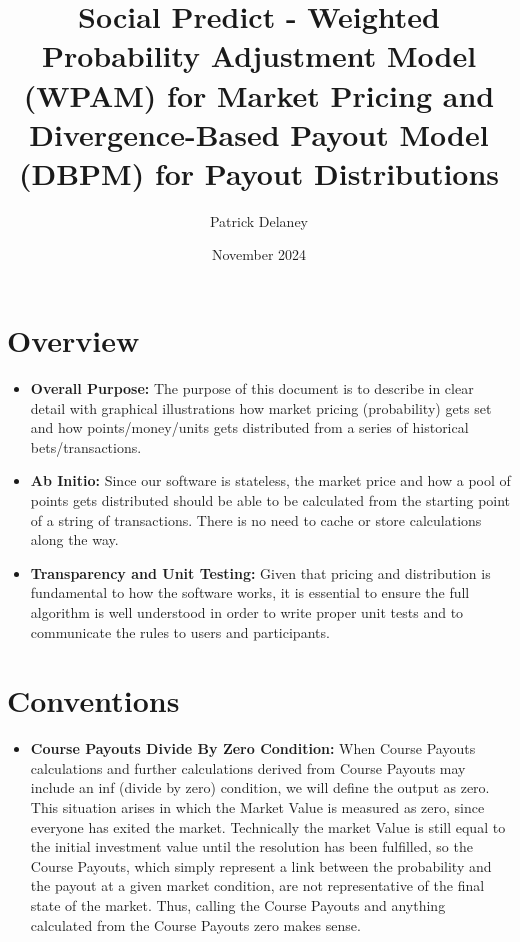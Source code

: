 \documentclass{article}
\title{Social Predict - Weighted Probability Adjustment Model (WPAM) for Market Pricing and Divergence-Based Payout Model (DBPM) for Payout Distributions}
\author{Patrick Delaney}
\date{November 2024}
\begin{document}
\maketitle

\section{Overview}

\begin{itemize}
    \item \textbf{Overall Purpose:} The purpose of this document is to describe in clear detail with graphical illustrations how market pricing (probability) gets set and how points/money/units gets distributed from a series of historical bets/transactions.
    \item \textbf{Ab Initio:} Since our software is stateless, the market price and how a pool of points gets distributed should be able to be calculated from the starting point of a string of transactions. There is no need to cache or store calculations along the way.
    \item \textbf{Transparency and Unit Testing:} Given that pricing and distribution is fundamental to how the software works, it is essential to ensure the full algorithm is well understood in order to write proper unit tests and to communicate the rules to users and participants.
\end{itemize}

\section{Conventions}

\begin{itemize}
    \item \textbf{Course Payouts Divide By Zero Condition:} When Course Payouts calculations and further calculations derived from Course Payouts may include an inf (divide by zero) condition, we will define the output as zero. This situation arises in which the Market Value is measured as zero, since everyone has exited the market. Technically the market Value is still equal to the initial investment value until the resolution has been fulfilled, so the Course Payouts, which simply represent a link between the probability and the payout at a given market condition, are not representative of the final state of the market. Thus, calling the Course Payouts and anything calculated from the Course Payouts zero makes sense.
\end{itemize}
\end{document}
